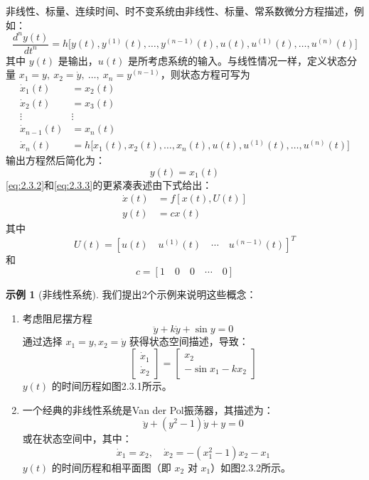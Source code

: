 \documentclass[UTF8,12pt,a4paper]{ctexart}
\theoremstyle{definition}
\newtheorem{example}{示例}[section]
\begin{document}
非线性、标量、连续时间、时不变系统由非线性、标量、常系数微分方程描述，例如：
\begin{equation}\label{eq:2.3.1}
\frac{d^n y(t)}{dt^n} = h\bigl[y(t), y^{(1)}(t), \ldots, y^{(n-1)}(t), u(t), u^{(1)}(t), \ldots, u^{(n)}(t)\bigr]
\end{equation}
其中 $y(t)$ 是输出，$u(t)$ 是所考虑系统的输入。与线性情况一样，定义状态分量 $x_1=y,\ x_2=\dot{y},\ \ldots,\ x_n=y^{(n-1)}$，则状态方程可写为
\begin{equation}\label{eq:2.3.2}
\begin{aligned}
\dot{x}_1(t) &= x_2(t) \\
\dot{x}_2(t) &= x_3(t) \\
\vdots & \vdots \\
\dot{x}_{n-1}(t) &= x_n(t) \\
\dot{x}_n(t) &= h\bigl[x_1(t), x_2(t), \ldots, x_n(t), u(t), u^{(1)}(t), \ldots, u^{(n)}(t)\bigr]
\end{aligned}
\end{equation}
输出方程然后简化为：
\begin{equation}\label{eq:2.3.3}
y(t) = x_1(t)
\end{equation}
\eqref{eq:2.3.2}和\eqref{eq:2.3.3}的更紧凑表述由下式给出：
\begin{equation}\label{eq:2.3.4}
\begin{aligned}
\dot{x}(t) &= f[x(t), U(t)] \\
y(t) &= cx(t)
\end{aligned}
\end{equation}
其中
\[
U(t) = [u(t) \quad u^{(1)}(t) \quad \cdots \quad u^{(n-1)}(t)]^T
\]
和
\begin{equation}\label{eq:2.3.5}
c = [1 \quad 0 \quad 0 \quad \cdots \quad 0]
\end{equation}

\begin{example}[非线性系统]
我们提出2个示例来说明这些概念：
\begin{enumerate}
\item 考虑阻尼摆方程
\[
\ddot{y} + k\dot{y} + \sin y = 0
\]
通过选择 $x_1=y, x_2=\dot{y}$ 获得状态空间描述，导致：
\[
\begin{bmatrix} \dot{x}_1 \\ \dot{x}_2 \end{bmatrix} = \begin{bmatrix} x_2 \\ -\sin x_1 - kx_2 \end{bmatrix}
\]
$y(t)$ 的时间历程如图2.3.1所示。

\item 一个经典的非线性系统是Van der Pol振荡器，其描述为：
\[
\ddot{y} + (y^2-1)\dot{y} + y = 0
\]
或在状态空间中，其中：
\[
\dot{x}_1 = x_2, \quad \dot{x}_2 = -(x_1^2-1)x_2 - x_1
\]
$y(t)$ 的时间历程和相平面图（即 $x_2$ 对 $x_1$）如图2.3.2所示。
\end{enumerate}
\end{example}
\end{document}
